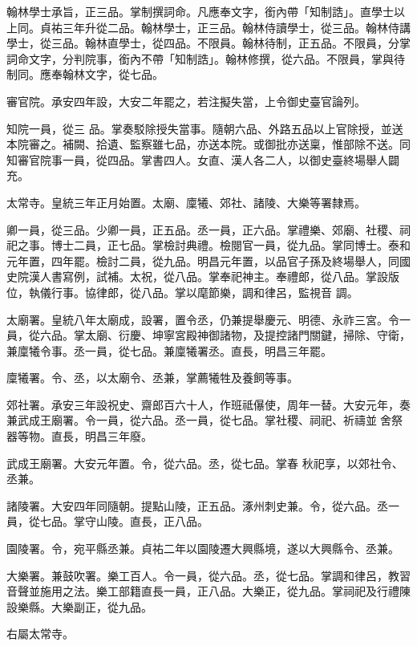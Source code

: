 \begin{pinyinscope}
 翰林學士承旨，正三品。掌制撰詞命。凡應奉文字，銜內帶「知制誥」。直學士以上同。貞祐三年升從二品。翰林學士，正三品。翰林侍讀學士，從三品。翰林侍講學士，從三品。翰林直學士，從四品。不限員。翰林待制，正五品。不限員，分掌詞命文字，分判院事，銜內不帶「知制誥」。翰林修撰，從六品。不限員，掌與待制同。應奉翰林文字，從七品。



 審官院。承安四年設，大安二年罷之，若注擬失當，上令御史臺官論列。



 知院一員，從三
 品。掌奏駁除授失當事。隨朝六品、外路五品以上官除授，並送本院審之。補闕、拾遺、監察雖七品，亦送本院。或御批亦送稟，惟部除不送。同知審官院事一員，從四品。掌書四人。女直、漢人各二人，以御史臺終場舉人闢充。



 太常寺。皇統三年正月始置。太廟、廩犧、郊社、諸陵、大樂等署隸焉。



 卿一員，從三品。少卿一員，正五品。丞一員，正六品。掌禮樂、郊廟、社稷、祠祀之事。博士二員，正七品。掌檢討典禮。檢閱官一員，從九品。掌同博士。泰和元年置，四年罷。檢討二員，從九品。明昌元年置，以品官子孫及終場舉人，同國史院漢人書寫例，試補。太祝，從八品。掌奉祀神主。奉禮郎，從八品。掌設版位，執儀行事。協律郎，從八品。掌以麾節樂，調和律呂，監視音
 調。



 太廟署。皇統八年太廟成，設署，置令丞，仍兼提舉慶元、明德、永祚三宮。令一員，從六品。掌太廟、衍慶、坤寧宮殿神御諸物，及提控諸門關鍵，掃除、守衛，兼廩犧令事。丞一員，從七品。兼廩犧署丞。直長，明昌三年罷。



 廩犧署。令、丞，以太廟令、丞兼，掌薦犧牲及養飼等事。



 郊社署。承安三年設祝史、齋郎百六十人，作班祗儤使，周年一替。大安元年，奏兼武成王廟署。令一員，從六品。丞一員，從七品。掌社稷、祠祀、祈禱並舍祭器等物。直長，明昌三年廢。



 武成王廟署。大安元年置。令，從六品。丞，從七品。掌春
 秋祀享，以郊社令、丞兼。



 諸陵署。大安四年同隨朝。提點山陵，正五品。涿州刺史兼。令，從六品。丞一員，從七品。掌守山陵。直長，正八品。



 園陵署。令，宛平縣丞兼。貞祐二年以園陵遷大興縣境，遂以大興縣令、丞兼。



 大樂署。兼鼓吹署。樂工百人。令一員，從六品。丞，從七品。掌調和律呂，教習音聲並施用之法。樂工部籍直長一員，正八品。大樂正，從九品。掌祠祀及行禮陳設樂縣。大樂副正，從九品。



 右屬太常寺。



\end{pinyinscope}